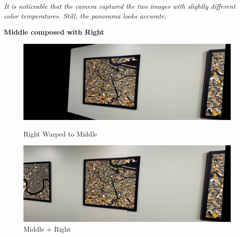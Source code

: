 \step
\emph{
  It is noticeable that the camera captured the two images with
  slightly different color temperatures.
  Still, the panorama looks accurate.
}

\newpage
\textbf{Middle composed with Right}
\begin{figure}[H]
  \centering
  \begin{minipage}{0.79\textwidth}
    \includegraphics[width=\textwidth]{images/warped-right-2.jpg}
    \caption{Right Warped to Middle}
    \label{fig:cv-desk}
  \end{minipage}
  \hfill
  \begin{minipage}{0.79\textwidth}
    \includegraphics[width=\textwidth]{images/panorama-2.jpg}
    \caption{Middle + Right}
    \label{fig:hp-desk}
  \end{minipage}
\end{figure}

